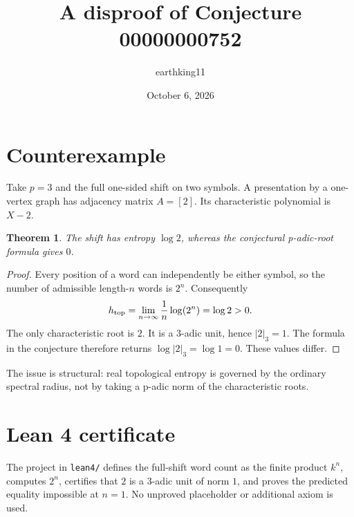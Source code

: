 \documentclass[11pt]{article}
\title{A disproof of Conjecture 00000000752}
\author{earthking11}
\date{October 6, 2026}
\newtheorem{theorem}{Theorem}
\begin{document}
\maketitle
\section*{Counterexample}
Take $p=3$ and the full one-sided shift on two symbols.  A presentation by a
one-vertex graph has adjacency matrix $A=[2]$.  Its characteristic polynomial
is $X-2$.

\begin{theorem}
The shift has entropy $\log 2$, whereas the conjectural p-adic-root formula
gives $0$.
\end{theorem}
\begin{proof}
Every position of a word can independently be either symbol, so the number of
admissible length-$n$ words is $2^n$.  Consequently
\[
 h_{\rm top}=\lim_{n\to\infty}\frac1n\log(2^n)=\log 2>0.
\]
The only characteristic root is $2$.  It is a $3$-adic unit, hence
$|2|_3=1$.  The formula in the conjecture therefore returns $\log|2|_3=
\log1=0$.  These values differ.
\end{proof}

The issue is structural: real topological entropy is governed by the ordinary
spectral radius, not by taking a p-adic norm of the characteristic roots.

\section*{Lean 4 certificate}
The project in \texttt{lean4/} defines the full-shift word count as the finite
product $k^n$, computes $2^n$, certifies that $2$ is a $3$-adic unit of norm
$1$, and proves the predicted equality impossible at $n=1$.  No unproved
placeholder or additional axiom is used.
\end{document}
